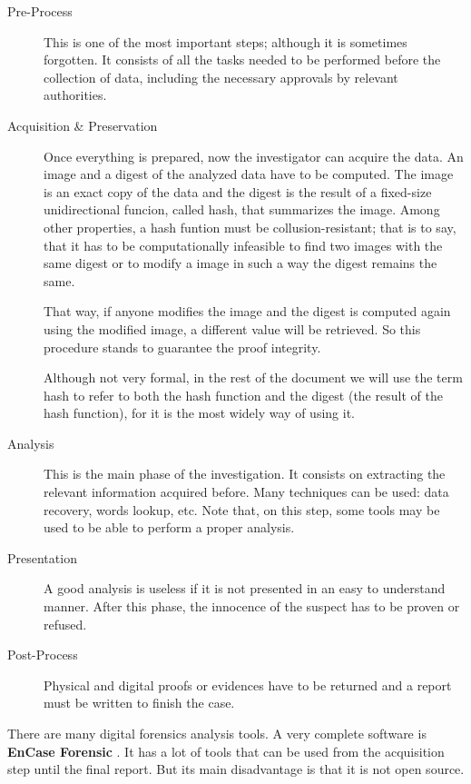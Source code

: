 \begin{description}
	\item [Pre-Process]
		This is one of the most important steps; although it is sometimes 
		forgotten. It consists of all the tasks needed to be performed
		before the collection of data, including the necessary approvals 
		by relevant authorities.

	\item [Acquisition \& Preservation]
		Once everything is prepared, now the investigator can acquire 
		the data. An image and a digest of the analyzed data have to be
		computed. The image is an exact copy of the data and the digest is the
		result of a fixed-size unidirectional funcion, called hash, 
		that summarizes the image. Among other properties, a hash funtion must
		be collusion-resistant; that is to say, that it has to be
		computationally infeasible to find two images with the same digest or
		to modify a image in such a way the digest remains the same.

		That way, if anyone modifies the image and the digest is computed
		again using the modified image, a different value will be 
		retrieved. So this procedure stands to guarantee the proof 
		integrity.
		
		Although not very formal, in the rest of the document we will use the
		term hash to refer to both the hash function and the digest (the result
		of the hash function), for it is the most widely way of using it.

	\item [Analysis]
		This is the main phase of the investigation. It consists on extracting
		the relevant information acquired before. Many techniques can be 
		used: data recovery, words lookup, etc. Note that, on this step,
		some tools may be used to be able to perform a proper analysis.

	\item [Presentation]
		A good analysis is useless if it is not presented in an easy to 
		understand manner. After this phase, the innocence of the
		suspect has to be proven or refused.

	\item [Post-Process]
		Physical and digital proofs or evidences have to be returned and a
		report must be written to finish the case.

\end{description}

There are many digital forensics analysis tools. A very complete software is 
\textbf{EnCase Forensic} \cite{encase-web}. It has a lot of tools that can be 
used from the acquisition step until the final report. But its main disadvantage
is that it is not open source.


